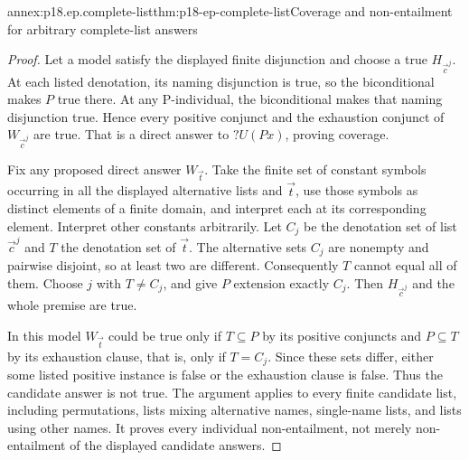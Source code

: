 \begin{annexitem}{annex:p18.ep.complete-list}{thm:p18-ep-complete-list}{Coverage and non-entailment for arbitrary complete-list answers}
\begin{proof}
Let a model satisfy the displayed finite disjunction and choose a true
\(H_{\vec c^{j}}\). At each listed denotation, its naming disjunction
is true, so the biconditional makes \(P\) true there. At any P-individual,
the biconditional makes that naming disjunction true. Hence every positive
conjunct and the exhaustion conjunct of \(W_{\vec c^{j}}\) are true.
That is a direct answer to \(?U(Px)\), proving coverage.

Fix any proposed direct answer \(W_{\vec t}\). Take the finite set of
constant symbols occurring in all the displayed alternative lists and
\(\vec t\), use those symbols as distinct elements of a finite domain,
and interpret each at its corresponding element. Interpret other constants
arbitrarily. Let \(C_j\) be the denotation set of list
\(\vec c^{j}\) and \(T\) the denotation set of \(\vec t\).
The alternative sets \(C_j\) are nonempty and pairwise disjoint, so
at least two are different. Consequently \(T\) cannot equal all of them.
Choose \(j\) with \(T\ne C_j\), and give \(P\) extension exactly
\(C_j\). Then \(H_{\vec c^{j}}\) and the whole premise are true.

In this model \(W_{\vec t}\) could be true only if \(T\subseteq P\)
by its positive conjuncts and \(P\subseteq T\) by its exhaustion
clause, that is, only if \(T=C_j\). Since these sets differ, either
some listed positive instance is false or the exhaustion clause is false.
Thus the candidate answer is not true. The argument applies to every
finite candidate list, including permutations, lists mixing alternative
names, single-name lists, and lists using other names. It proves every
individual non-entailment, not merely non-entailment of the displayed
candidate answers.
\end{proof}
\end{annexitem}

